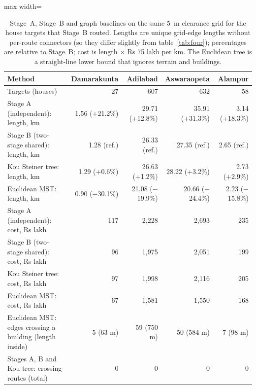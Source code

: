 \documentclass[preprint,12pt]{elsarticle}
\begin{document}
\begin{table}[htbp]
\caption{Stage~A, Stage~B and graph baselines on the same $5$~m clearance grid for the house targets that Stage~B routed. Lengths are unique grid-edge lengths without per-route connectors (so they differ slightly from table~\ref{tab:four}); percentages are relative to Stage~B; cost is length $\times$ Rs 75 lakh per km. The Euclidean tree is a straight-line lower bound that ignores terrain and buildings.}
\label{tab:graphbase}
\centering
\footnotesize
\begin{adjustbox}{max width=\textwidth}
\begin{tabular}{@{}lrrrr@{}}
\toprule
Method & Damarakunta & Adilabad & Aswaraopeta & Alampur\\
\midrule
Targets (houses) & 27 & 607 & 632 & 58\\
\midrule
Stage A (independent): length, km & 1.56 (+21.2\%) & 29.71 (+12.8\%) & 35.91 (+31.3\%) & 3.14 (+18.3\%)\\
Stage B (two-stage shared): length, km & 1.28 (ref.) & 26.33 (ref.) & 27.35 (ref.) & 2.65 (ref.)\\
Kou Steiner tree: length, km & 1.29 (+0.6\%) & 26.63 (+1.2\%) & 28.22 (+3.2\%) & 2.73 (+2.9\%)\\
Euclidean MST: length, km & 0.90 ($-$30.1\%) & 21.08 ($-$19.9\%) & 20.66 ($-$24.4\%) & 2.23 ($-$15.8\%)\\
\midrule
Stage A (independent): cost, Rs lakh & 117 & 2{,}228 & 2{,}693 & 235\\
Stage B (two-stage shared): cost, Rs lakh & 96 & 1{,}975 & 2{,}051 & 199\\
Kou Steiner tree: cost, Rs lakh & 97 & 1{,}998 & 2{,}116 & 205\\
Euclidean MST: cost, Rs lakh & 67 & 1{,}581 & 1{,}550 & 168\\
\midrule
Euclidean MST: edges crossing a building (length inside) & 5 (63 m) & 59 (750 m) & 50 (584 m) & 7 (98 m)\\
Stages A, B and Kou tree: crossing routes (total) & 0 & 0 & 0 & 0\\
\bottomrule
\end{tabular}
\end{adjustbox}
\end{table}
\end{document}
